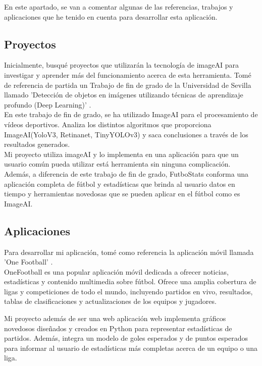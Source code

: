 
 En este apartado, se van a comentar algunas de las referencias, trabajos y aplicaciones que he tenido en cuenta para desarrollar esta aplicación.

 \subsection{Proyectos}
 Inicialmente, busqué proyectos que utilizarán la tecnología de imageAI para investigar y aprender más del funcionamiento acerca de esta herramienta.
 Tomé de referencia de partida un Trabajo de fin de grado de la Universidad de Sevilla llamado 'Detección de objetos en imágenes utilizando técnicas de aprendizaje profundo (Deep Learning)' \cite{tfgSevilla:latex}. \\
 En este trabajo de fin de grado, se ha utilizado ImageAI para el procesamiento de vídeos deportivos. Analiza los distintos algoritmos que proporciona ImageAI(YoloV3, Retinanet, TinyYOLOv3) y saca conclusiones a través de los resultados generados. \\

 Mi proyecto utiliza imageAI y lo implementa en una aplicación para que un usuario común pueda utilizar está herramienta sin ninguna complicación. Además, a diferencia de este trabajo de fin de grado, FutboStats conforma una aplicación completa de fútbol y estadísticas que brinda al usuario datos en tiempo y herramientas novedosas que se pueden aplicar en el fútbol como es ImageAI.

 \subsection{Aplicaciones}
 Para desarrollar mi aplicación, tomé como referencia la aplicación móvil llamada 'One Football' \cite{oneFootball}. \\
 OneFootball es una popular aplicación móvil dedicada a ofrecer noticias, estadísticas y contenido multimedia sobre fútbol. Ofrece una amplia cobertura de ligas y competiciones de todo el mundo, incluyendo partidos en vivo, resultados, tablas de clasificaciones y actualizaciones de los equipos y jugadores.

Mi proyecto además de ser una web aplicación web implementa gráficos novedosos diseñados y creados en Python para representar estadísticas de partidos. Además, integra un modelo de goles esperados y de puntos esperados para informar al usuario de estadísticas más completas acerca de un equipo o una liga. \\

